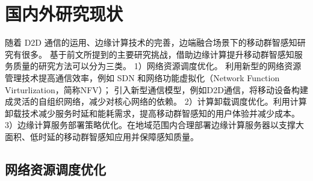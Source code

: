 








\section{国内外研究现状}

随着 D2D 通信的运用、边缘计算技术的完善，边端融合场景下的移动群智感知研究有很多。
基于前文所提到的主要研究挑战，借助边缘计算提升移动群智感知服务质量的研究方法可以分为三类。
1）网络资源调度优化。%
利用新型的网络资源管理技术提高通信效率，例如 SDN 和网络功能虚拟化（Network Function Virturlization，简称NFV）；
引入新型通信模型，例如D2D通信，将移动设备构建成灵活的自组织网络，减少对核心网络的依赖。
2）计算卸载调度优化。利用计算卸载技术减少服务时延和能耗需求，提高移动群智感知的用户体验并减少成本。
3）边缘计算服务部署策略优化。在地域范围内合理部署边缘计算服务器以支撑大面积、低时延的移动群智感知应用并保障感知质量。

\subsection{网络资源调度优化}

